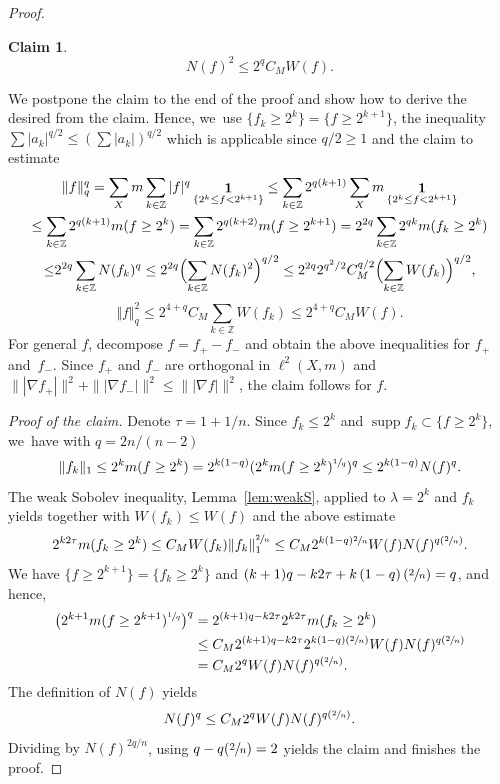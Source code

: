 \documentclass[10pt]{amsart}
\newcommand{\Psfrac}[2]{(\sfrac{#1}{#2})}
\theoremstyle{plain}
\theoremstyle{definition}
\newtheorem*{claim}{Claim}
\DeclareMathOperator{\supp}{supp}
\DeclareMathOperator{\Eins}{\mathbf{1}}
\begin{document}
\begin{proof}
\begin{claim}
\[
N(f)^{2}
\leq
2^{q}C_M
W(f).
\]
\end{claim}
We postpone the claim to the end of the proof and show how to derive the desired from the claim. Hence, we~use
$ \{f_k\geq 2^k\}=\{f\geq 2^{k+1}\} $, the inequality $\sum \vert a_k\vert^{q/2}\leq \left(\sum \vert a_k\vert\right)^{q/2}$ which is applicable since $q/2\geq 1$ and the claim to estimate
\begin{multline*}
\Vert f\Vert_q^q
=\sum_{X}m\sum_{k\in\mathbb{Z}}\vert f\vert^q\Eins_{\{2^k\leq f< 2^{k+1}\}}
\leq \sum_{k\in\mathbb{Z}}2^{q(k+1)}\sum_{X}m \Eins_{\{2^k\leq f< 2^{k+1}\}}
\\
\leq \sum_{k\in\mathbb{Z}}2^{q(k+1)}m(f\geq 2^k)
=\sum_{k\in\mathbb{Z}}2^{q(k+2)}m(f\geq 2^{k+1})
=2^{2q}\sum_{k\in\mathbb{Z}}2^{qk}m(f_k\geq 2^{k})
\\
{\le}2^{2q}\sum_{k\in\mathbb{Z}}N(f_k)^q
\leq 2^{2q}\Bigl(\sum_{k\in\mathbb{Z}}N(f_k)^2\Bigr)^{q/2}
\leq 2^{2q}2^{q^2/2}C_M^{q/2}\Bigl(\sum_{k\in\mathbb{Z}}
W(f_k)\Bigr)^{q/2},
\end{multline*}
\ie
\[
\Vert f\Vert_q^2
\leq 2^{4+q}C_M\sum_{k\in\mathbb{Z}}W(f_k)\leq 2^{4+q}C_M W(f).
\]
For general $f$, decompose $f=f_+-f_-$ and obtain the above inequalities for $f_+$ and~$f_-$. Since $ f_{+} $ and $ f_{-} $ are orthogonal in $\ell^2(X,m)$ and $ \||\nabla f_{+}|\|^{2} +\||\nabla f_{-}|\|^{2}\leq \||\nabla {f}|\|^{2} $, the claim follows for $f$.

\noindent
\emph{Proof of the claim.} Denote $\tau=1+1/n$.
Since $f_k\leq 2^k$ and $ \supp f_{k} \subset \{f\geq 2^k\} $, we~have {with $ q=2n/(n-2) $}
\[
\Vert f_k\Vert_1\leq 2^km(f\geq 2^k)
=2^{k\left(1-q\right)}(2^{k}m(f\geq 2^k)^{\sfrac{1}{q}})^{q}
\leq
2^{k\left(1-q\right)}N(f)^{q}.
\]
{The weak Sobolev inequality,} Lemma~\ref{lem:weakS}, applied to $\lambda=2^k$ and $f_k$ yields together with {$ W(f_{k})\leq W(f) $ and} the above estimate
\[
2^{k2\tau}m(f_k\geq 2^k)
\leq C_MW(f_k)\Vert f_k\Vert_1^{\sfrac2n}
\leq
C_M2^{k\left(1-q\right)\sfrac2n}W(f)N(f)^{q\Psfrac2n}.
\]
We have
$ \{f\geq 2^{k+1}\}=\{f_k\geq 2^k\} $ and $ (k+1)q-k2\tau+k\left(1-q\right)\Psfrac2n=q$, and hence,
\begin{align*}
\bigl(2^{k+1}m(f\geq 2^{k+1})^{\sfrac{1}{q}}\bigr)^{q}
&=2^{(k+1)q-k2\tau}2^{k2\tau} m(f_k\geq 2^k)
\\
&\leq
C_M2^{(k+1)q-k2\tau}2^{k\left(1-q\right)\Psfrac2n}W(f)N(f)^{q\Psfrac2n}
\\
&=
C_M2^{q
}W(f)N(f)^{q\Psfrac2n}.
\end{align*}
The definition of $N(f)$ yields
\[
N(f)^{q}
\leq
C_M2^{q}
W(f)N(f)^{q\Psfrac2n}.
\]
{Dividing by $N(f)^{2q/n}$}, using $q-q\Psfrac2n=2$ yields the claim {and finishes the proof}.
\end{proof}
\end{document}
